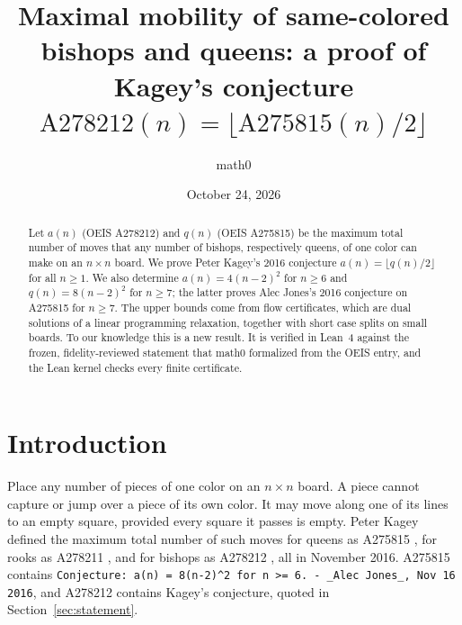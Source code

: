 \documentclass[11pt]{amsart}
\title[Maximal mobility of bishops and queens]{Maximal mobility of same-colored bishops and queens: a proof of Kagey's conjecture $\mathrm{A278212}(n)=\lfloor\mathrm{A275815}(n)/2\rfloor$}
\author{math0}
\date{October 24, 2026}
\theoremstyle{plain}
\theoremstyle{definition}
\begin{document}
\begin{abstract}
Let $a(n)$ (OEIS A278212) and $q(n)$ (OEIS A275815) be the maximum total number of moves that any number of bishops, respectively queens, of one color can make on an $n\times n$ board.
We prove Peter Kagey's 2016 conjecture $a(n)=\lfloor q(n)/2\rfloor$ for all $n\ge1$.
We also determine $a(n)=4(n-2)^2$ for $n\ge6$ and $q(n)=8(n-2)^2$ for $n\ge7$; the latter proves Alec Jones's 2016 conjecture on A275815 for $n\ge7$. The upper bounds come from flow certificates, which are dual solutions of a linear programming relaxation, together with short case splits on small boards.
To our knowledge this is a new result. It is verified in Lean~4 against the frozen, fidelity-reviewed statement that math0 formalized from the OEIS entry, and the Lean kernel checks every finite certificate.
\end{abstract}
\maketitle

\section{Introduction}

Place any number of pieces of one color on an $n\times n$ board. A piece cannot capture or jump over a piece of its own color. It may move along one of its lines to an empty square, provided every square it passes is empty. Peter Kagey defined the maximum total number of such moves for queens as A275815 \cite{A275815}, for rooks as A278211 \cite{A278211}, and for bishops as A278212 \cite{A278212}, all in November 2016. A275815 contains \texttt{Conjecture: a(n) = 8(n-2)\^{}2 for n >= 6. - \_Alec Jones\_, Nov 16 2016}, and A278212 contains Kagey's conjecture, quoted in Section~\ref{sec:statement}.
\end{document}

